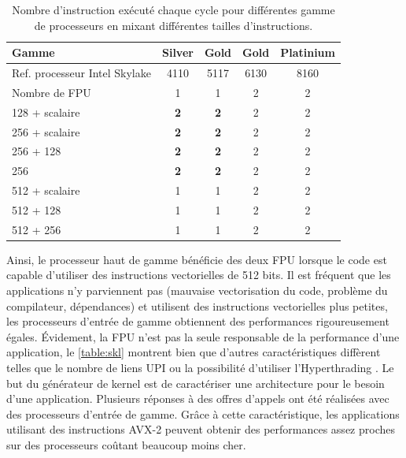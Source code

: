         
        \begin{table}[h!]
        \normalsize
        \caption{Nombre d'instruction exécuté chaque cycle pour différentes gamme de processeurs en mixant différentes tailles d'instructions.}
        \label{res:skl}
        \centering
        \begin{tabular}{|l|c|c|c|c|}
            \hline
            \rowcolor[HTML]{EFEFEF} 
            Gamme & Silver & Gold & Gold & Platinium \\ \hline
            \rowcolor[HTML]{EFEFEF} 
            Ref. processeur Intel Skylake & 4110 & 5117 & 6130 & 8160 \\ \hline
            \rowcolor[HTML]{EFEFEF} 
            Nombre de FPU & 1 & 1 & 2 & 2 \\ \hline
            128 + scalaire & \textbf{2} & \textbf{2} & 2 & 2 \\ \hline
            256 + scalaire & \textbf{2} & \textbf{2} & 2 & 2 \\ \hline
            256 + 128 & \textbf{2} & \textbf{2} & 2 & 2 \\ \hline
            256 & \textbf{2} & \textbf{2} & 2 & 2 \\ \hline
            512 + scalaire & 1 & 1 & 2 & 2 \\ \hline
            512 + 128 & 1 & 1 & 2 & 2 \\ \hline
            512 + 256 & 1 & 1 & 2 & 2 \\ \hline
        
        \end{tabular}
        \end{table}
        
        
        
       Ainsi, le processeur haut de gamme bénéficie des deux FPU lorsque le code est capable d'utiliser des instructions vectorielles de 512 bits. Il est fréquent que les applications n'y parviennent pas (mauvaise vectorisation du code, problème du compilateur, dépendances) et utilisent des instructions vectorielles plus petites, les processeurs d'entrée de gamme obtiennent des performances rigoureusement égales. Évidement, la FPU n'est pas la seule responsable de la performance d'une application, le \autoref{table:skl} montrent bien que d'autres caractéristiques diffèrent telles que le nombre de liens UPI ou la possibilité d'utiliser l'Hyperthrading . Le but du générateur de kernel est de caractériser une architecture pour le besoin d'une application. Plusieurs réponses à des offres d'appels ont été réalisées avec des processeurs d'entrée de gamme. Grâce à cette caractéristique, les applications utilisant des instructions AVX-2 peuvent obtenir des performances assez proches sur des processeurs coûtant beaucoup moins cher.



